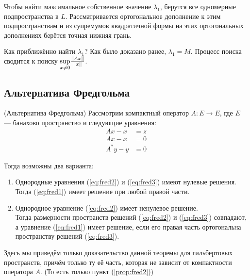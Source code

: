 \documentclass[12pt]{article}
\begin{document}
			{\color{gray}Чтобы найти максимальное собственное значение $\lambda_1$, берутся все одномерные подпространства в $L$. 
			Рассматривается ортогональное дополнение к этим подпространствам и из супремумов квадратичной формы на
			этих ортогональных дополнениях берётся точная нижняя грань.}
	
			Как приближённо найти $\lambda_1$? Как было доказано ранее, $\lambda_1 = M$. Процесс поиска сводится к поиску 
			$\underset{x\neq0}{\sup}{\frac{\left\| Ax \right\|}{\left\| x \right\|}}$.
	
	\subsection{Альтернатива Фредгольма}
	
		\begin{theorem}
			(Альтернатива Фредгольма) Рассмотрим компактный оператор $A: E\rightarrow E$, где $E$ --- банахово 
			пространство и следующие уравнения:
			\begin{align}
				Ax - x &= z   \tag{но} \label{eq:fred1} \\
				Ax - x &= 0   \tag{о} \label{eq:fred2} \\
				A^*y - y &= 0 \tag{со} \label{eq:fred3}
			\end{align}
		
			Тогда возможны два варианта:
			\begin{enumerate}
				\item Однородные уравнения (\ref{eq:fred2}) и (\ref{eq:fred3}) имеют нулевые решения. \label{prop:fred1}\\
				Тогда (\ref{eq:fred1}) имеет решение при любой правой части.
			
				\item Однородное уравнение (\ref{eq:fred2}) имеет ненулевое решение. \label{prop:fred2}\\
				Тогда размерности пространств решений (\ref{eq:fred2}) и (\ref{eq:fred3}) совпадают,
				а уравнение (\ref{eq:fred1}) имеет решение, если его правая часть ортогональна 
				пространству решений (\ref{eq:fred3}).
			\end{enumerate}
		\end{theorem}
		Здесь мы приведём только доказательство данной теоремы для гильбертовых пространств, причём только ту её 
		часть, которая не зависит от компактности оператора $A$. (То есть только пункт (\ref{prop:fred2}))
\end{document}
